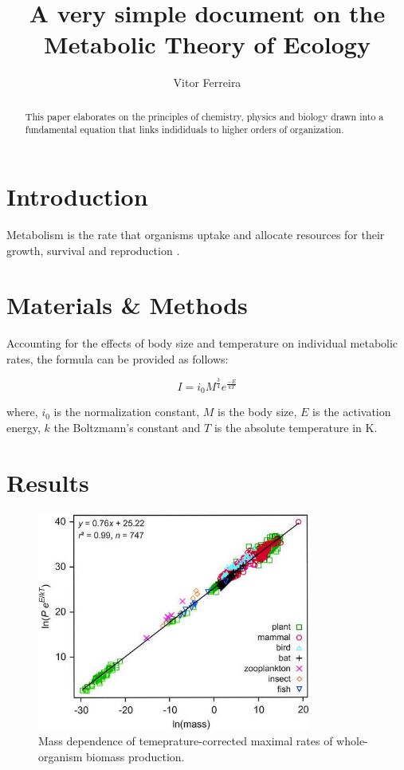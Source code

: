 \documentclass[12pt]{article}
\title{A very simple document on the Metabolic Theory of Ecology}
\author{Vitor Ferreira}
\date{}
\begin{document}
  \maketitle
  
  \begin{abstract}

    This paper elaborates on the principles of chemistry, physics and biology drawn into a fundamental equation that links indididuals to higher orders of organization.
  \end{abstract}
  
  \section{Introduction}

    Metabolism is the rate that organisms uptake and allocate resources for their growth, survival and reproduction \cite{brown2004toward}.

  \section{Materials \& Methods}

    Accounting for the effects of body size and temperature on individual metabolic rates, the formula can be provided as follows:
  
  \begin{equation}
    I = i_0 M^\frac{3}{4} e^\frac{-E}{kT}
  \end{equation}

    where, $i_0$ is the normalization constant, $M$ is the body size, $E$ is the activation energy, $k$ the Boltzmann's constant and $T$ is the absolute temperature in K.


  \section{Results}

    \begin{figure}[H]
      \begin{center}
      \includegraphics[width=0.8\textwidth]{../data/mass_dependence_temp.jpg}
      \caption{Mass dependence of temeprature-corrected maximal rates of whole-organism biomass production.}
      \label{fig:mass_dep_temp}
      \end{center}
    \end{figure}
\end{document}
